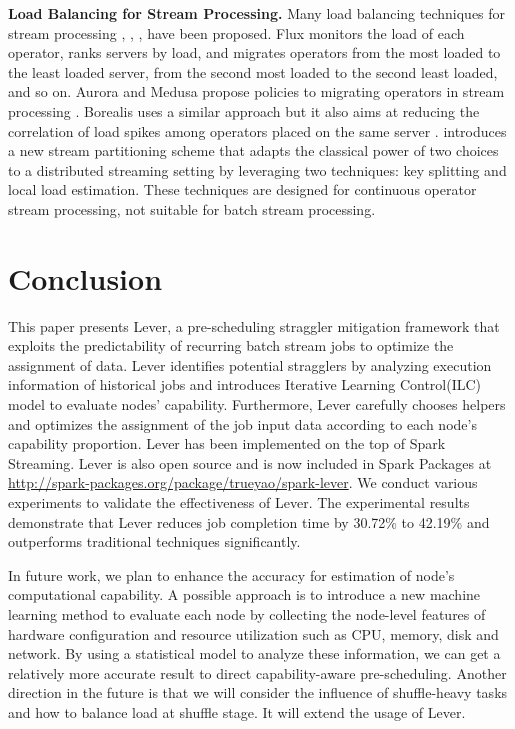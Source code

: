 \documentclass[10pt,conference,compsocconf,letterpaper]{IEEEtran}
\begin{document}
  \textbf{Load Balancing for Stream Processing.} Many load balancing techniques for stream processing \cite{Shah2003}, \cite{Cherniack2003}, \cite{Xing2005}, \cite{Anis2015} have been proposed. Flux \cite{Shah2003} monitors the load of each operator, ranks servers by load, and migrates operators from the most loaded to the least loaded server, from the second most loaded to the second least loaded, and so on. Aurora and Medusa propose policies to migrating operators in stream processing \cite{Cherniack2003}. Borealis uses a similar approach but it also aims at reducing the correlation of load spikes among operators placed on the same server \cite{Xing2005}. \cite{Anis2015} introduces a new stream partitioning scheme that adapts the classical power of two choices to a distributed streaming setting by leveraging two techniques: key splitting and local load estimation. These techniques are designed for continuous operator stream processing, not suitable for batch stream processing.

\section{Conclusion}

  This paper presents Lever, a pre-scheduling straggler mitigation framework that exploits the predictability of recurring batch stream jobs to optimize the assignment of data. Lever identifies potential stragglers by analyzing execution information of historical jobs and introduces Iterative Learning Control(ILC) model to evaluate nodes' capability. Furthermore, Lever carefully chooses helpers and optimizes the assignment of the job input data according to each node's capability proportion. Lever has been implemented on the top of Spark Streaming. Lever is also open source and is now included in Spark Packages at \url{http://spark-packages.org/package/trueyao/spark-lever}. We conduct various experiments to validate the effectiveness of Lever. The experimental results demonstrate that Lever reduces job completion time by 30.72\% to 42.19\% and outperforms traditional techniques significantly.

  In future work, we plan to enhance the accuracy for estimation of node's computational capability. A possible approach is to introduce a new machine learning method to evaluate each node by collecting the node-level features of hardware configuration and resource utilization such as CPU, memory, disk and network. By using a statistical model to analyze these information, we can get a relatively more accurate result to direct capability-aware pre-scheduling. Another direction in the future is that we will consider the influence of shuffle-heavy tasks and how to balance load at shuffle stage. It will extend the usage of Lever.
\end{document}
